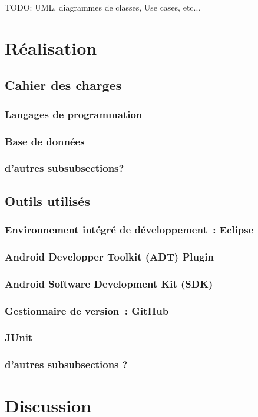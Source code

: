 \documentclass[a4paper,11pt,french]{article}
\begin{document}
TODO: UML, diagrammes de classes, Use cases, etc...


\section{Réalisation}
\subsection{Cahier des charges}
\subsubsection{Langages de programmation}
\subsubsection{Base de données}
\subsubsection{d'autres subsubsections?}

\subsection{Outils utilisés}
\subsubsection{Environnement intégré de développement~: Eclipse}
\subsubsection{Android Developper Toolkit (ADT) Plugin}
\subsubsection{Android Software Development Kit (SDK)}
\subsubsection{Gestionnaire de version~: GitHub}
\subsubsection{JUnit}
\subsubsection{d'autres subsubsections ?}


\section{Discussion}
\end{document}
